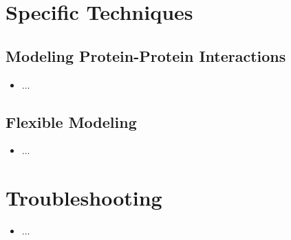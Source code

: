 \documentclass{article}
\begin{document}
\section{Specific Techniques}
\subsection{Modeling Protein-Protein Interactions}
\begin{itemize}
    \item ...
\end{itemize}

\subsection{Flexible Modeling}
\begin{itemize}
    \item ...
\end{itemize}

\section{Troubleshooting}
\begin{itemize}
    \item ...
\end{itemize}


\end{document}
